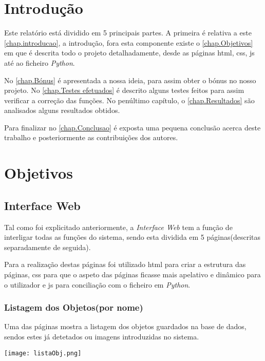 \documentclass{report}
\begin{document}
\tableofcontents


\clearpage
{}

\chapter{Introdução}
\label{chap.introducao}
Este relatório está dividido em 5 principais partes. A primeira é relativa a este \autoref{chap.introducao}, a introdução, fora esta componente existe o \autoref{chap.Objetivos} em que é descrita todo o projeto detalhadamente, desde as páginas \ac{html}, \ac{css}, \ac{js} até ao ficheiro \textit{Python}.

No \autoref{chap.Bónus} é apresentada a nossa ideia, para assim obter o bónus no nosso projeto.
No \autoref{chap.Testes efetuados} é descrito alguns testes feitos para assim verificar a correção das funções. No penúltimo capítulo, o \autoref{chap.Resultados} são analisados alguns resultados obtidos.

Para finalizar no \autoref{chap.Conclusao} é exposta uma pequena conclusão acerca deste trabalho e posteriormente as contribuições dos autores.

\chapter{Objetivos}
\label{chap.Objetivos}
\section{Interface Web}
Tal como foi explicitado anteriormente, a \textit{Interface Web} tem a função de interligar todas as funções do sistema, sendo esta dividida em 5 páginas(descritas separadamente de seguida). 

Para a realização destas páginas foi utilizado \ac{html} para criar a estrutura das páginas, \ac{css} para que o aspeto das páginas ficasse mais apelativo e dinâmico para o utilizador e \ac{js} para conciliação com o ficheiro em \textit{Python}.

\subsection{Listagem dos Objetos(por nome)}
Uma das páginas mostra a listagem dos objetos guardados na base de dados, sendos estes já detetados ou imagens introduzidas no sistema.
\newline
\begin{center}
   \texttt{[image: listaObj.png]}
\end{center}
\end{document}
